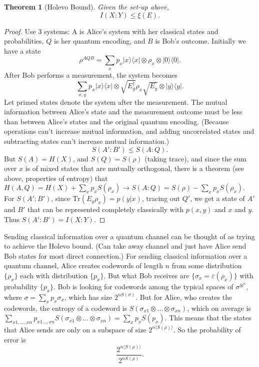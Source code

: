 \documentclass[12pt]{article}
\newtheorem{theorem}{Theorem}[section]
\begin{document}
\begin{theorem}[Holevo Bound]
Given the set-up above, 
$$I(X:Y)\leq \xi(E).$$
\end{theorem}

\begin{proof}
Use 3 systems: A is Alice's system with her classical states and probabilities, $Q$ is her quantum encoding, and $B$ is Bob's outcome.
Initially we have a state
$$\rho^{AQB}=\sum_xp_x|x\rangle\langle x|\otimes \rho_x\otimes|0\rangle\langle 0|.$$
After Bob performs a measurement, the system becomes
$$\sum_{x,y}p_x|x\rangle\langle x|\otimes \sqrt{E_y^\dagger}\rho_x\sqrt{E_y}\otimes|y\rangle\langle y|.$$
Let primed states denote the system after the measurement.
The mutual information between Alice's state and the measurement outcome must be less than between Alice's states and the original quantum encoding. (Because operations can't increase mutual information, and adding uncorrelated states and subtracting states can't increase mutual information.)
$$ S(A':B')\leq S(A:Q).$$
But $S(A)=H(X)$, and $S(Q)=S(\rho)$ (taking trace), and since the sum over $x$ is of mixed states that are mutually orthogonal, there is a theorem (see above, properties of entropy) that 
$H(A,Q)=H(X)+\sum_xp_xS(\rho_x) \rightarrow S(A:Q)=S(\rho)-\sum_xp_xS(\rho_x). $
For $S(A':B')$, since $\text{Tr}(E_y\rho_x)=p(y|x)$, tracing out $Q'$, we get a state of $A'$ and $B'$ that can 
be represented completely classically with $p(x,y)$ and $x$ and $y$. Thus $S(A
':B')=I(X:Y)$.

\end{proof}
 
 
 Sending classical information over a quantum channel can be thought of as trying to achieve the Holevo bound. (Can take away channel and just have Alice send Bob states for most direct connection.) For sending classical information over a quantum channel, Alice creates codewords of length $n$ from some distribution $\{\rho_x\}$ each with distribution $\{p_x\}$. But what Bob receives are $\{\sigma_x=\varepsilon(\rho_x)\}$ with probability $\{p_x\}$. Bob is looking for codewords among the typical spaces of $\sigma^{\otimes^n}$, where $\sigma=\sum_xp_x\sigma_x$, which has size $2^{nS(\sigma)}$. But for Alice, who creates the codewords, the entropy of a codeword is $S(\sigma_{x1}\otimes\dots\otimes\sigma_{xn})$, which on average is $\sum_{x1,\dots,xn}p_{x1\dots,xn}S(\sigma_{x1}\otimes\dots\otimes\sigma_{xn})=\sum_xp_xS(p_x)$. This means that the states that Alice sends are only on a subspace of size $2^{n\langle S(\rho)\rangle}$. So the probability of error is 
 $$\frac{2^{n\langle S(\rho)\rangle}}{2^{nS(\rho)}}.$$
\end{document}
